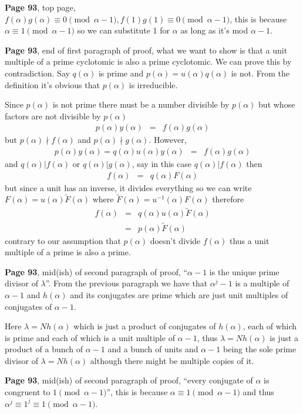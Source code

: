 \documentclass[aps,preprint,preprintnumbers,nofootinbib,showpacs,prd]{revtex4-1}
\newcommand{\nbea}{\begin{eqnarray*}}
\newcommand{\neea}{\end{eqnarray*}}
\begin{document}
{\bf Page 93}, top page, $f(\alpha)g(\alpha) \equiv 0 \pmod{\alpha - 1}, f(1)g(1) \equiv 0 \pmod{\alpha - 1}$, this is because $\alpha \equiv 1 \pmod{\alpha - 1}$ so we can substitute 1 for $\alpha$ as long as it's mod $\alpha - 1$.

{\bf Page 93}, end of first paragraph of proof, what we want to show is that a unit multiple of a prime cyclotomic is also a prime cyclotomic. We can prove this by contradiction. Say $q(\alpha)$ is prime and $p(\alpha) = u(\alpha)q(\alpha)$ is not. From the definition it's obvious that $p(\alpha)$ is irreducible.

Since $p(\alpha)$ is not prime there must be a number divisible by $p(\alpha)$ but whose factors are not divisible by $p(\alpha)$
%
\nbea
p(\alpha) y(\alpha) & = & f(\alpha) g(\alpha)
\neea
%
but $p(\alpha)\nmid f(\alpha)$ and $p(\alpha) \nmid g(\alpha)$. However,
%
\nbea
p(\alpha) y(\alpha)  = q(\alpha) u(\alpha) y(\alpha)& = & f(\alpha) g(\alpha)
\neea
%
and $q(\alpha)|f(\alpha)$ or $q(\alpha)|g(\alpha)$, say in this case $q(\alpha)|f(\alpha)$ then
%
\nbea
f(\alpha) & = & q(\alpha) F(\alpha)
\neea
%
but since a unit has an inverse, it divides everything so we can write $F(\alpha) = u(\alpha) \tilde F(\alpha)$ where $\tilde F(\alpha) = u^{-1}(\alpha) F(\alpha)$ therefore
%
\nbea
f(\alpha) & = & q(\alpha) u(\alpha)\tilde F(\alpha) \\
& = & p(\alpha) \tilde F(\alpha)
\neea
%
contrary to our assumption that $p(\alpha)$ doesn't divide $f(\alpha)$ thus a unit multiple of a prime is also a prime.

{\bf Page 93}, mid(ish) of second paragraph of proof, ``$\alpha - 1$ is the unique prime divisor of $\lambda$''. From the previous paragraph we have that $\alpha^j - 1$ is a multiple of $\alpha - 1$ and $h(\alpha)$ and its conjugates are prime which are just unit multiples of conjugates of $\alpha - 1$. 

Here $\lambda = Nh(\alpha)$ which is just a product of conjugates of $h(\alpha)$, each of which is prime and each of which is a unit multiple of $\alpha - 1$, thus $\lambda = Nh(\alpha)$ is just a product of a bunch of $\alpha - 1$ and a bunch of units and $\alpha - 1$ being the sole prime divisor of $\lambda = Nh(\alpha)$ although there might be multiple copies of it.

{\bf Page 93}, mid(ish) of second paragraph of proof, ``every conjugate of $\alpha$ is congruent to $1 \pmod{\alpha - 1}$'', this is because $\alpha \equiv 1 \pmod{\alpha-1}$ and thus $\alpha^j \equiv 1^j \equiv 1 \pmod{\alpha-1}$.
\end{document}
